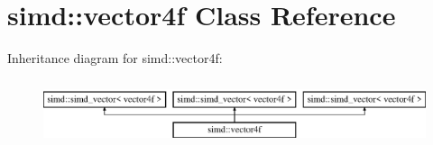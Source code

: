 \hypertarget{classsimd_1_1vector4f}{\section{simd\+:\+:vector4f Class Reference}
\label{classsimd_1_1vector4f}
}
Inheritance diagram for simd\+:\+:vector4f\+:\begin{figure}[H]
\begin{center}
\leavevmode
\includegraphics[height=1.964912cm]{classsimd_1_1vector4f}
\end{center}
\end{figure}
